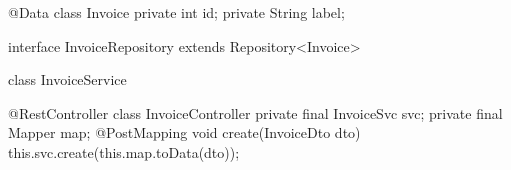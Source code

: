 \documentclass{article}
\begin{document}



\begin{multicols}{2}
{\small\begin{ffcode}
@Data
class Invoice {
  private int id;
  private String label;
}
\end{ffcode}
}
\par\columnbreak\par
{\small\begin{ffcode}
interface InvoiceRepository extends Repository<Invoice> {}
\end{ffcode}
}
\end{multicols}
\plush{}

\begin{multicols}{2}

{\small\begin{ffcode}
class InvoiceService {}
\end{ffcode}
}
\par\columnbreak\par
{\small\begin{ffcode}
@RestController
class InvoiceController {
  private final InvoiceSvc svc;
  private final Mapper map;
  @PostMapping
  void create(InvoiceDto dto) {
    this.svc.create(this.map.toData(dto));
  }
}
\end{ffcode}
}
\end{multicols}
\plush{}
\end{document}
